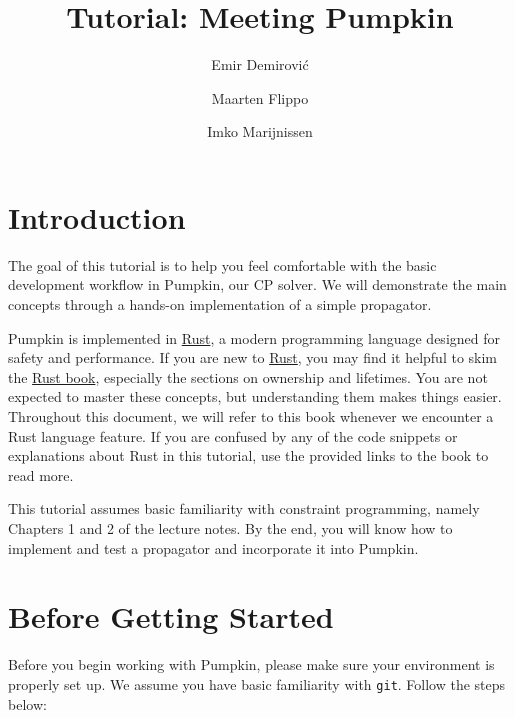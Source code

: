 \documentclass{article}
\title{Tutorial: Meeting Pumpkin}
\author{Emir Demirović \and Maarten Flippo \and Imko Marijnissen}
\begin{document}
\maketitle

\section{Introduction}
    The goal of this tutorial is to help you feel comfortable with the basic development workflow in Pumpkin, our CP solver. We will demonstrate the main concepts through a hands-on implementation of a simple propagator.
    
    Pumpkin is implemented in \href{https://rust-lang.org/}{Rust}, a modern programming language designed for safety and performance. If you are new to \href{https://rust-lang.org/}{Rust}, you may find it helpful to skim the \href{https://doc.rust-lang.org/book/}{Rust book}, especially the sections on ownership and lifetimes. You are not expected to master these concepts, but understanding them makes things easier. Throughout this document, we will refer to this book whenever we encounter a Rust language feature. If you are confused by any of the code snippets or explanations about Rust in this tutorial, use the provided links to the book to read more.

    This tutorial assumes basic familiarity with constraint programming, namely Chapters 1 and 2 of the lecture notes. By the end, you will know how to implement and test a propagator and incorporate it into Pumpkin.

\section{Before Getting Started}

    Before you begin working with Pumpkin, please make sure your environment is properly set up. We assume you have basic familiarity with \texttt{git}. Follow the steps below:
\end{document}

